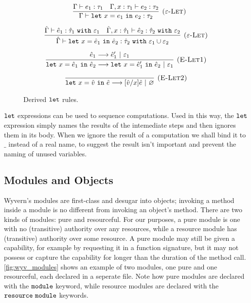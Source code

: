 \begin{figure}[h]

 \\
 \\

\[
\begin{array}{c}

	~~~
	
	\infer[\textsc{($\varepsilon$-Let)}]
	{\Gamma \vdash \letxpr{x}{e_1}{e_2}: \tau_2}
	{\Gamma \vdash e_1: \tau_1 & \Gamma, x: \tau_1 \vdash e_2: \tau_2} \\[2ex]

\infer[\textsc{($\varepsilon$-Let)}]
	{\hat \Gamma \vdash \letxpr{x}{\hat e_1}{\hat e_2} : \hat \tau_2~\kw{with} \varepsilon_1 \cup \varepsilon_2}
	{\hat \Gamma \vdash \hat e_1 : \hat \tau_1~\kw{with} \varepsilon_1 & \hat \Gamma, x: \hat \tau_1 \vdash \hat e_2: \hat \tau_2~\kw{with} \varepsilon_2} \\[2ex]
	
\infer[\textsc{(E-Let1)}]
	{\letxpr{x}{\hat e_1}{\hat e_2} \longrightarrow \letxpr{x}{\hat e_1'}{\hat e_2}~|~\varepsilon_1}
	{\hat e_1 \longrightarrow \hat e_1'~|~\varepsilon_1} \\[2ex]
	
\infer[\textsc{(E-Let2)}]
	{\letxpr{x}{\hat v}{\hat e} \longrightarrow [\hat v/x]\hat e~|~\varnothing}
	{} 

\end{array}
\]

\caption{Derived $\mathtt{let}$ rules.}
\label{fig:let_rules}
\end{figure}

$\mathtt{let}$ expressions can be used to sequence computations. Used in this way, the $\mathtt{let}$ expression simply names the results of the intemediate steps and then ignores them in its body. When we ignore the result of a computation we shall bind it to $\_$ instead of a real name, to suggest the result isn't important and prevent the naming of unused variables.

\subsection{Modules and Objects}

Wyvern's modules are first-class and desugar into objects; invoking a method inside a module is no different from invoking an object's method. There are two kinds of modules: pure and resourceful. For our purposes, a pure module is one with no (transitive) authority over any resources, while a resource module has (transitive) authority over some resource. A pure module may still be given a capability, for example by requesting it in a function signature, but it may not possess or capture the capability for longer than the duration of the method call. \ref{fig:wyv_modules} shows an example of two modules, one pure and one resourceful, each declared in a seperate file. Note how pure modules are declared with the $\mathtt{module}$ keyword, while resource modules are declared with the $\mathtt{resource~module}$ keywords.

